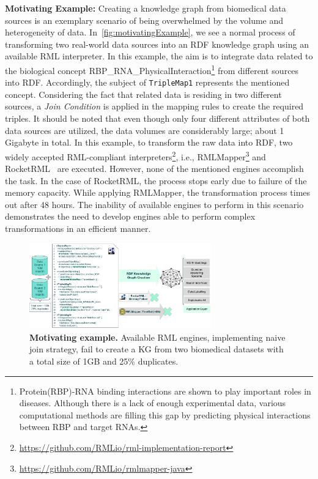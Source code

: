 \noindent \textbf{Motivating Example:}
Creating a knowledge graph from biomedical data sources is an exemplary scenario of being overwhelmed by the volume and heterogeneity of data. 
In~\autoref{fig:motivatingExample}, we see a normal process of transforming two real-world data sources into an RDF knowledge graph using an available RML interpreter. 
In this example, the aim is to integrate data related to the biological concept RBP\_RNA\_PhysicalInteraction\footnote{Protein(RBP)-RNA binding interactions are shown to play important roles in diseases.
Although there is a lack of enough experimental data, various computational methods are filling this gap by predicting physical interactions between RBP and target RNAs.} from different sources into RDF. 
Accordingly, the subject of \texttt{TripleMap1} represents the mentioned concept. 
Considering the fact that related data is residing in two different sources, a \textit{Join Condition} is applied in the mapping rules to create the required triples. 
It should be noted that even though only four different attributes of both data sources are utilized, the data volumes are considerably large; about 1 Gigabyte in total. 
In this example, to transform the raw data into RDF, two widely accepted RML-compliant interpreters\footnote{\url{https://github.com/RMLio/rml-implementation-report}}, i.e., RMLMapper\footnote{\url{https://github.com/RMLio/rmlmapper-java}} and RocketRML~\citep{csimcsek2019rocketrml} are executed. 
However, none of the mentioned engines accomplish the task. 
In the case of RocketRML, the process stops early due to failure of the memory capacity. 
While applying RMLMapper, the transformation process times out after 48 hours. 
The inability of available engines to perform in this scenario demonstrates the need to develop engines able to perform complex transformations in an efficient manner.
\\
\begin{figure}[t!]
\centering
\includegraphics[width=0.7\textwidth]{figures/Motivating_Example_v1.1.pdf}
\caption[SDM-RDFizer motivating example]{\textbf{Motivating example.} Available RML engines, implementing naive join strategy, fail to create a KG from two biomedical datasets with a total size of 1GB and 25\% duplicates.} 
\label{fig:motivatingExample}
\end{figure}

